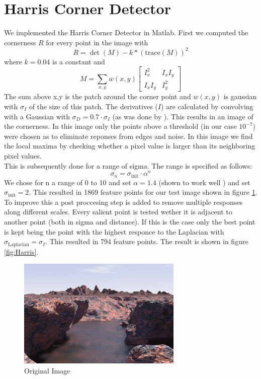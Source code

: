 \documentclass{article}
\begin{document}
\section{Harris Corner Detector}
We implemented the Harris Corner Detector in Matlab. 
First we computed the cornerness $R$ for every point in the image with
\begin{equation}
R = \det(M) - k*(\mathrm{trace}(M))^2
\end{equation}
where $k=0.04$ is a constant and
\begin{equation}
M = \sum_{x,y} w(x,y) \begin{bmatrix}
I_x^2 & I_x I_y\\
I_x I_y & I_y^2
\end{bmatrix}
\end{equation}
The sum above x,y is the patch around the corner point and $w(x,y)$ is gaussian with $\sigma_I$ of the size of this patch. The derivatives ($I$) are calculated by convolving with a Gaussian with $\sigma_D = 0.7 \cdot \sigma_I$ (as was done by \cite{Miko}). This results in an image of the cornerness. In this image only the points above a threshold (in our case $10^{-7}$) were chosen as to eliminate reponses from edges and noise. In this image we find the local maxima by checking whether a pixel value is larger than its neighboring pixel values.\\
This is subsequently done for a range of sigma. The range is specified as follows:
\[
\sigma_n = \sigma_\mathrm{init} \cdot \alpha^n
\]
We chose for n a range of 0 to 10 and set $\alpha = 1.4$ (shown to work well \cite{lindeberg}) and set $\sigma_\mathrm{init} = 2$. This resulted in 1869 feature points for our test image shown in figure \ref{fig:mountain}.\\
To improve this a post proccesing step is added to remove multiple responses along different scales. Every salient point is tested wether it is adjacent to another point (both in sigma and distance). If this is the case only the best point is kept being the point with the highest responce to the Laplacian with $\sigma_\mathrm{Laplacian} = \sigma_I$. This resulted in 794 feature points. The result is shown in figure \ref{fig:Harris}.

\begin{figure}[ht]
\centering
\includegraphics[width=0.7\textwidth]{img/mountain.jpg}
\caption{Original Image}
\label{fig:mountain}
\end{figure}
\end{document}
